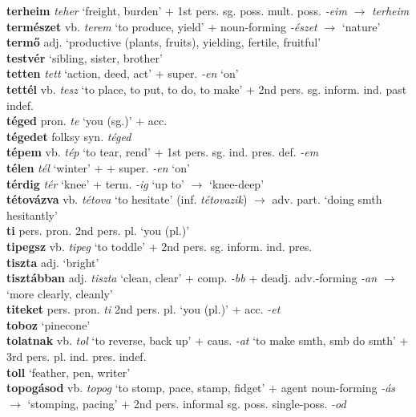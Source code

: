 \documentclass[11pt]{article}
\begin{document}
\textbf{terheim} \emph{teher} `freight, burden' + 1st
pers. sg. poss. mult. poss. \emph{-eim}
$\rightarrow$ \emph{terheim} \\
\textbf{természet} vb. \emph{terem} `to produce, yield' +
noun\hyp{}forming \emph{-észet} $\rightarrow$ `nature' \\
\textbf{termő} adj. `productive (plants, fruits), yielding, fertile,
fruitful' \\
\textbf{testvér} `sibling, sister, brother' \\
\textbf{tetten} \emph{tett} `action, deed, act' +
super. \emph{-en} `on' \\
\textbf{tettél} vb. \emph{tesz} `to place, to put, to do, to make' + 2nd
pers. sg. inform. ind. past indef. \\
\textbf{téged} pron. \emph{te} `you (sg.)' + acc. \\
\textbf{tégedet} folksy syn. \emph{téged} \\
\textbf{tépem} vb. \emph{tép} `to tear, rend' + 1st
pers. sg. ind. pres. def. \emph{-em} \\
\textbf{télen} \emph{tél} `winter' + + super. \emph{-en} `on' \\
\textbf{térdig} \emph{tér} `knee' + term. \emph{-ig} `up to'
$\rightarrow$ `knee\hyp{}deep' \\
\textbf{tétovázva} vb. \emph{tétova} `to hesitate'
(inf. \emph{tétovazik}) $\rightarrow$ adv. part. `doing smth
hesitantly' \\
\textbf{ti} pers. pron. 2nd pers. pl. `you (pl.)' \\
\textbf{tipegsz} vb. \emph{tipeg} `to toddle' + 2nd
pers. sg. inform. ind. pres. \\
\textbf{tiszta} adj. `bright' \\
\textbf{tisztábban} adj. \emph{tiszta} `clean, clear' +
comp. \emph{-bb} + deadj. adv.\hyp{}forming \emph{-an} $\rightarrow$
`more clearly, cleanly' \\
\textbf{titeket} pers. pron. \emph{ti} 2nd pers. pl. `you (pl.)' +
acc. \emph{-et} \\
\textbf{toboz} `pinecone' \\
\textbf{tolatnak} vb. \emph{tol} `to reverse, back up' +
caus. \emph{-at} `to make smth, smb do smth' + 3rd
pers. pl. ind. pres. indef. \\
\textbf{toll} `feather, pen, writer' \\
\textbf{topogásod} vb. \emph{topog} `to stomp, pace, stamp, fidget' +
agent noun\hyp{}forming \emph{-ás} $\rightarrow$ `stomping, pacing' + 2nd
pers. informal sg. poss. single\hyp{}poss. \emph{-od} \\
\end{document}
